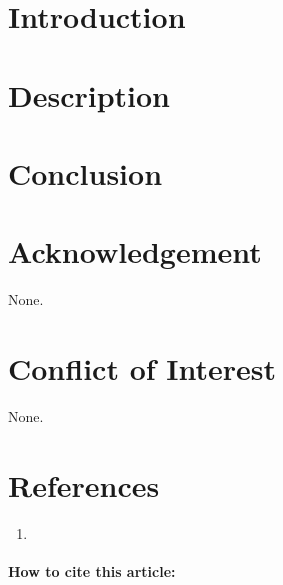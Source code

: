 \documentclass[10pt]{article} %
\begin{document}
\begin{multicols}{2}
\fontsize{9}{10.8}\selectfont\color{Black}

\section*{Introduction}
\begin{otherlanguage}{\VAR{lang_name}}
\end{otherlanguage}


\vspace{-0.4cm}
\section*{Description}
\begin{otherlanguage}{\VAR{lang_name}}
\end{otherlanguage}


\vspace{-0.4cm}
\section*{Conclusion}
\begin{otherlanguage}{\VAR{lang_name}}
\end{otherlanguage}


\vspace{-0.4cm}
\section*{Acknowledgement}
\begin{otherlanguage}{\VAR{lang_name}}
None.
\end{otherlanguage}

\vspace{-0.4cm}
\section*{Conflict of Interest}
\begin{otherlanguage}{\VAR{lang_name}}
None.
\end{otherlanguage}


\vspace{-0.4cm}
\section*{References}
\fontsize{8}{9.6}\selectfont
\begin{enumerate}
        \item \href{\VAR{item.url}}{ }
\end{enumerate}

\begin{framed}
\noindent\fontsize{8.5}{10.2}\selectfont
\textbf{How to cite this article:} 
\end{framed}


\end{multicols}
\end{document}
